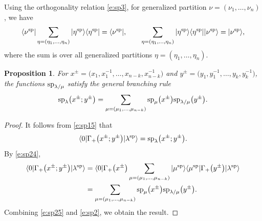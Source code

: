 \documentclass[pdftex]{sigma}
\numberwithin{equation}{section}
\newtheorem{Proposition}[Theorem]{Proposition}
 { \theoremstyle{definition}
\newtheorem{Definition}[Theorem]{Definition}
\newtheorem{Note}[Theorem]{Note}
\newtheorem{Example}[Theorem]{Example}
\newtheorem{Remark}[Theorem]{Remark} }
\begin{document}
Using the orthogonality relation \eqref{e:sp3}, for generalized partition $\nu=(\nu_1,\dots,\nu_n)$, we have
\begin{align}
\label{e:sp24}\langle\nu^{\rm sp}|\sum_{\eta=(\eta_1,\dots,\eta_n)}|\eta^{\rm sp}\rangle\langle\eta^{\rm sp}| = \langle\nu^{\rm sp}|,\qquad
\sum_{\eta=(\eta_1,\dots,\eta_n)}|\eta^{\rm sp}\rangle\langle\eta^{\rm sp}||\nu^{\rm sp}\rangle = |\nu^{\rm sp}\rangle,
\end{align}
where the sum is over all generalized partitions $\eta=(\eta_1,\dots,\eta_n)$.
\begin{Proposition}\label{e:pro10}For $x^{\pm}=\big(x_1,x^{-1}_1,\dots,x_{n-k},x^{-1}_{n-k}\big)$ and $y^{\pm}=\big(y_1,y^{-1}_1,\dots,y_{k},y^{-1}_{k}\big)$, the functions ${\rm sp}_{\lambda/\mu}$ satisfy the general branching rule
\begin{align}\label{e:sp30}
{\rm sp}_\lambda\big(x^{\pm};y^{\pm}\big)=\sum_{\mu=(\mu_1,\dots,\mu_{n-k})}{\rm sp}_\mu\big(x^{\pm}\big){\rm sp}_{\lambda/\mu}\big(y^{\pm}\big).
\end{align}
\end{Proposition}
\begin{proof}
It follows from \eqref{e:sp15} that
\begin{align}\label{e:sp25}
\langle0|\Gamma_{+}\big(x^{\pm};y^{\pm}\big)|\lambda^{\rm sp}\rangle={\rm sp}_\lambda\big(x^{\pm};y^{\pm}\big).
\end{align}
By \eqref{e:sp24},
\begin{align}
\langle0|\Gamma_{+}\big(x^{\pm};y^{\pm}\big)|\lambda^{\rm sp}\rangle&=\langle0|\Gamma_{+}\big(x^{\pm}\big)\sum_{\mu=(\mu_1,\dots,\mu_{n-k})}|\mu^{\rm sp}\rangle\langle\mu^{\rm sp}|\Gamma_{+}\big(y^{\pm}\big)|\lambda^{\rm sp}\rangle\nonumber\\
&=\sum_{\mu=(\mu_1,\dots,\mu_{n-k})}{\rm sp}_\mu\big(x^{\pm}\big){\rm sp}_{\lambda/\mu}\big(y^{\pm}\big).\label{e:sp2}
\end{align}
Combining \eqref{e:sp25} and \eqref{e:sp2}, we obtain the result.
\end{proof}
\end{document}
